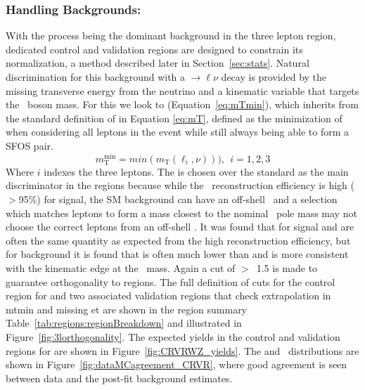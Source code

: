\subsubsection{Handling Backgrounds: \WZ}
\label{sec:crwz}
With the \WZ process being the dominant background in the three lepton region, dedicated control and validation regions are designed to constrain its normalization, a method described later in Section~\ref{sec:stats}.
Natural discrimination for this background with a \Wboson$\rightarrow\ell\nu$ decay is provided by the missing transverse energy from the neutrino and a kinematic variable that targets the \Wboson\ boson mass.
For this we look to \mTmin (Equation~\ref{eq:mTmin}), which inherits from the standard definition of \mT in Equation \ref{eq:mT},
defined as the minimization of \mT when considering all leptons in the event while still always being able to form a SFOS pair. 
\begin{equation}
m_{\mathrm{T}}^{\mathrm{min}} = min(m_{\mathrm{T}}(\ell_{i},\nu))),~~ i=1,2,3
\label{eq:mTmin}
\end{equation}
Where $i$ indexes the three leptons.
The \mTmin is chosen over the standard \mT as the main discriminator in the \WZ regions because while the \Zboson\ reconstruction efficiency is high ($>$95\%) for signal, the SM \WZ background can have an off-shell \Zboson\ and a selection which matches leptons to form a mass closest to the nominal \Zboson\ pole mass may not choose the correct leptons from an off-shell \Zboson. 
It was found that for signal \mT and \mTmin are often the same quantity as expected from the high reconstruction efficiency, but for background it is found that \mTmin is often much lower than \mT and is more consistent with the kinematic edge at the \Wboson\ mass. 
Again a cut of \dRbb$>$~1.5 is made to guarantee orthogonality to \ttZ regions.
The full definition of cuts for the control region for \WZ and two associated validation regions that check extrapolation in mtmin and missing et are shown in the region summary Table~\ref{tab:regions:regionBreakdown} and illustrated in Figure~\ref{fig:3lorthogonality}.
The expected yields in the control and validation regions for \WZ are shown in Figure~\ref{fig:CRVRWZ_yields}.
The \mTmin and \met\ distributions are shown in Figure~\ref{fig:dataMCagreement_CRVR}, where good agreement is seen between data and the post-fit background estimates.

